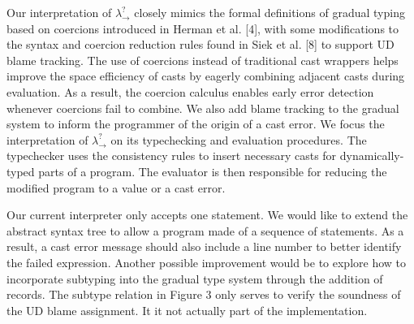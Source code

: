 Our interpretation of $\lambda ^? _{\rightarrow}$ closely 
mimics the formal definitions of gradual typing based on coercions introduced in 
Herman et al. [4], with some modifications to the syntax 
and coercion reduction rules found in Siek et al. [8] to 
support UD blame tracking. The use of coercions instead of 
traditional cast wrappers helps improve the space efficiency  
of casts by eagerly combining adjacent casts during 
evaluation. As a result, the coercion calculus enables 
early error detection whenever coercions fail to combine. 
We also add blame tracking to the gradual system  
to inform the programmer of the origin of a cast error. 
We focus the interpretation of $\lambda ^? _{\rightarrow}$ on its 
typechecking and evaluation procedures. The typechecker 
uses the consistency rules to insert necessary casts for 
dynamically-typed parts of a program. The evaluator is then 
responsible for reducing the modified program to a value 
or a cast error. 

Our current interpreter only accepts one statement. We would 
like to extend the abstract syntax tree to allow a program made of 
a sequence of statements. As a result, a cast error message 
should also include a line number to better identify the 
failed expression. Another possible improvement would be to 
explore how to incorporate subtyping 
into the gradual type system through the addition of records. 
The subtype relation in Figure 3 only 
serves to verify the soundness of the UD blame assignment. It 
it not actually part of the implementation. 
